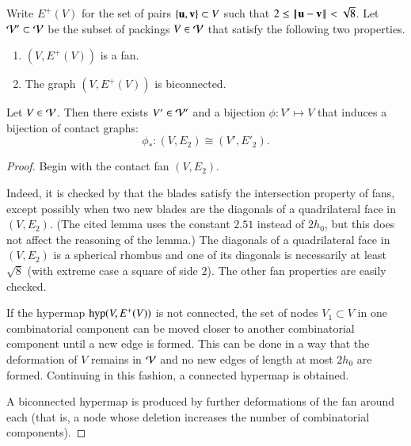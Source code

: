 \documentclass{llncs}
\def\op#1{{\hbox{#1}}}
\begin{document}
\begin{definition}[$\CalV'$,~$E^+(V)$]
  Write
$E^+(V)$ for the set of pairs $\{{\mathbf u},{\mathbf v}\}\subset V$
  such that $2\le\norm{\u}{\v} <\sqrt8$.
Let ${\mathcal V}'\subset{\mathcal V}$ be the subset of packings $V\in{\mathcal V}$ that
satisfy the following two properties. 
\begin{enumerate}
\item  $(V,E^+(V))$ is a fan.
\item The graph $(V,E^+(V))$ is biconnected.
\end{enumerate}
\end{definition}
%
%



\begin{lemma}\label{lemma:V'-bi} 
Let $V\in {\mathcal V}$.  Then there exists $V'\in {\mathcal V}'$ and a bijection 
 $\phi:V'\mapsto V$ that induces a bijection
  of contact graphs:
\[
\phi_*:(V,E_{2}) \cong (V',E'_{2}).
\]
\end{lemma}


\begin{proof}
  Begin with the contact fan $(V,E_{2})$.  

   Indeed, it is checked by
  \cite[Lemma~4.30]{Hales:2006:DCG} that the blades satisfy the
  intersection property of fans, except possibly when two new blades
  are the diagonals of a quadrilateral face in $(V,E_{2})$.  (The
  cited lemma uses the constant $2.51$ instead of $2h_0$, but this
  does not affect the reasoning of the lemma.)  The diagonals of a quadrilateral face
  in $(V,E_{2})$ is a spherical rhombus and one of its diagonals is
  necessarily at least $\sqrt8$ (with extreme case a square of side
  $2$).  The other fan properties are easily checked.

  If the hypermap $\op{hyp}(V,E^+(V))$ is not connected,
  the set of nodes $V_1\subset V$ in one combinatorial component can
  be moved closer to another combinatorial component until a new edge
  is formed.  This can be done in a way that the deformation of $V$
  remains in ${\mathcal V}$ and no new edges of length at most $2h_0$ are formed.
  Continuing in this fashion, a connected hypermap is obtained.

A biconnected hypermap is produced by  further
 deformations of the fan around each   (that is, a node 
whose deletion increases the number of combinatorial components).
\end{proof}
\end{document}
